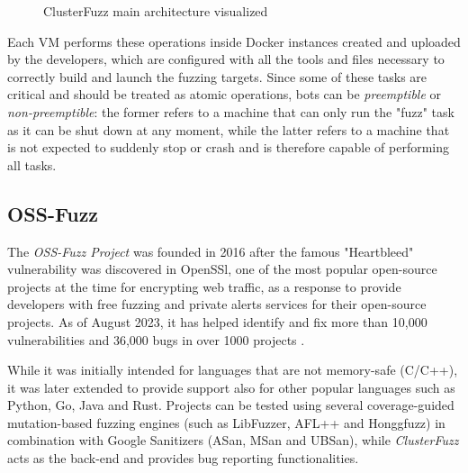 \begin{figure}[h]
\caption{ClusterFuzz main architecture visualized \cite{clusterfuzz_docs}}
\label{fig:clusterfuzz_architecture}
\end{figure}

Each VM performs these operations inside Docker instances created and uploaded by the developers, which are configured with all the tools and files necessary to correctly build and launch the fuzzing targets. Since some of these tasks are critical and should be treated as atomic operations, bots can be \textit{preemptible} or \textit{non-preemptible}: the former refers to a machine that can only run the "fuzz" task as it can be shut down at any moment, while the latter refers to a machine that is not expected to suddenly stop or crash and is therefore capable of performing all tasks.



\subsection{OSS-Fuzz}
The \textit{OSS-Fuzz Project} \cite{ossfuzz_paper} was founded in 2016 after the famous "Heartbleed" vulnerability was discovered in OpenSSl, one of the most popular open-source projects at the time for encrypting web traffic, as a response to provide developers with free fuzzing and private alerts services for their open-source projects. As of August 2023, it has helped identify and fix more than 10,000 vulnerabilities and 36,000 bugs in over 1000 projects \cite{ossfuzz_docs}.


While it was initially intended for languages that are not memory-safe (C/C++), it was later extended to provide support also for other popular languages such as Python, Go, Java and Rust. Projects can be tested using several coverage-guided mutation-based fuzzing engines (such as LibFuzzer, AFL++ and Honggfuzz) in combination with Google Sanitizers (ASan, MSan and UBSan), while \textit{ClusterFuzz} acts as the back-end and provides bug reporting functionalities.


